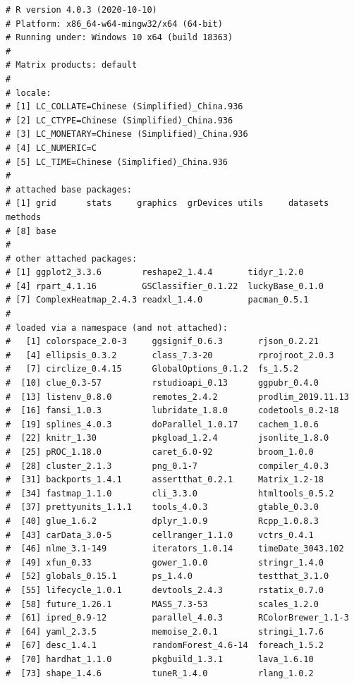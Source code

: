 \documentclass[
  12pt,
]{book}
\begin{document}
\begin{verbatim}
# R version 4.0.3 (2020-10-10)
# Platform: x86_64-w64-mingw32/x64 (64-bit)
# Running under: Windows 10 x64 (build 18363)
# 
# Matrix products: default
# 
# locale:
# [1] LC_COLLATE=Chinese (Simplified)_China.936 
# [2] LC_CTYPE=Chinese (Simplified)_China.936   
# [3] LC_MONETARY=Chinese (Simplified)_China.936
# [4] LC_NUMERIC=C                              
# [5] LC_TIME=Chinese (Simplified)_China.936    
# 
# attached base packages:
# [1] grid      stats     graphics  grDevices utils     datasets  methods  
# [8] base     
# 
# other attached packages:
# [1] ggplot2_3.3.6        reshape2_1.4.4       tidyr_1.2.0         
# [4] rpart_4.1.16         GSClassifier_0.1.22  luckyBase_0.1.0     
# [7] ComplexHeatmap_2.4.3 readxl_1.4.0         pacman_0.5.1        
# 
# loaded via a namespace (and not attached):
#   [1] colorspace_2.0-3     ggsignif_0.6.3       rjson_0.2.21        
#   [4] ellipsis_0.3.2       class_7.3-20         rprojroot_2.0.3     
#   [7] circlize_0.4.15      GlobalOptions_0.1.2  fs_1.5.2            
#  [10] clue_0.3-57          rstudioapi_0.13      ggpubr_0.4.0        
#  [13] listenv_0.8.0        remotes_2.4.2        prodlim_2019.11.13  
#  [16] fansi_1.0.3          lubridate_1.8.0      codetools_0.2-18    
#  [19] splines_4.0.3        doParallel_1.0.17    cachem_1.0.6        
#  [22] knitr_1.30           pkgload_1.2.4        jsonlite_1.8.0      
#  [25] pROC_1.18.0          caret_6.0-92         broom_1.0.0         
#  [28] cluster_2.1.3        png_0.1-7            compiler_4.0.3      
#  [31] backports_1.4.1      assertthat_0.2.1     Matrix_1.2-18       
#  [34] fastmap_1.1.0        cli_3.3.0            htmltools_0.5.2     
#  [37] prettyunits_1.1.1    tools_4.0.3          gtable_0.3.0        
#  [40] glue_1.6.2           dplyr_1.0.9          Rcpp_1.0.8.3        
#  [43] carData_3.0-5        cellranger_1.1.0     vctrs_0.4.1         
#  [46] nlme_3.1-149         iterators_1.0.14     timeDate_3043.102   
#  [49] xfun_0.33            gower_1.0.0          stringr_1.4.0       
#  [52] globals_0.15.1       ps_1.4.0             testthat_3.1.0      
#  [55] lifecycle_1.0.1      devtools_2.4.3       rstatix_0.7.0       
#  [58] future_1.26.1        MASS_7.3-53          scales_1.2.0        
#  [61] ipred_0.9-12         parallel_4.0.3       RColorBrewer_1.1-3  
#  [64] yaml_2.3.5           memoise_2.0.1        stringi_1.7.6       
#  [67] desc_1.4.1           randomForest_4.6-14  foreach_1.5.2       
#  [70] hardhat_1.1.0        pkgbuild_1.3.1       lava_1.6.10         
#  [73] shape_1.4.6          tuneR_1.4.0          rlang_1.0.2         

\end{verbatim}
\end{document}
